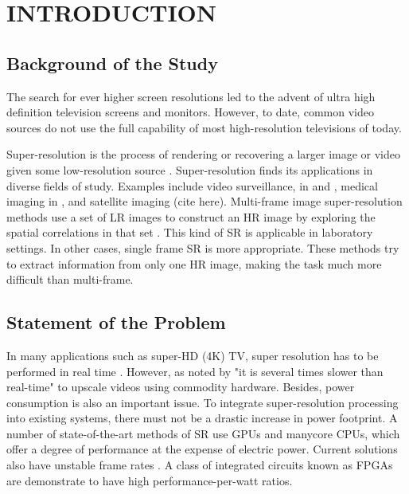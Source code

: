 
\chapter{INTRODUCTION} %

\label{Chapter1} %



\section{Background of the Study}
The search for ever higher screen resolutions led to the advent of ultra high definition television screens and monitors. However, to date, common video sources do not use the full capability of most high-resolution televisions of today.

Super-resolution is the process of rendering or recovering a larger image or video given some low-resolution source \citep{Dong2014}.
Super-resolution finds its applications in diverse fields of study. Examples include video surveillance, in \cite{Caner2003} and \cite{Zhang2010},  medical imaging in \cite{Malczewski2008}, and satellite imaging (cite here).
Multi-frame image super-resolution methods use a set of LR images to construct an HR image by exploring the spatial correlations in that set \citep{Cheng2013}.
This kind of SR is applicable in laboratory settings.
In other cases, single frame SR is more appropriate. 
These methods try to extract information from only one HR image, making the task much more difficult than multi-frame.




\section{Statement of the Problem}

In many applications such as super-HD (4K) TV, super resolution has to be performed in real time \citep{Shen2014}. However, as noted by \cite{Ishizaka2013} "it is several times slower than real-time" to upscale videos using commodity hardware.
Besides, power consumption is also an important issue. 
To integrate super-resolution processing into existing systems, there must not be a drastic increase in power footprint. 
A number of state-of-the-art methods of SR use GPUs and manycore CPUs, which offer a degree of performance at the expense of electric power.
Current solutions also have unstable frame rates \citep{Wu2011}.
A class of integrated circuits known as FPGAs are demonstrate to have high performance-per-watt ratios.

